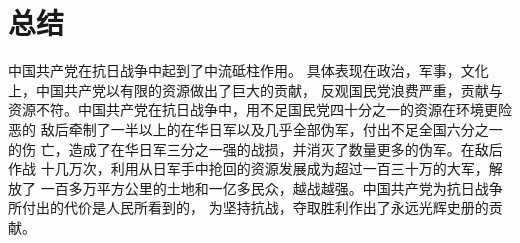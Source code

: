 \documentclass[a4paper]{article}
\begin{document}
\section{总结}
中国共产党在抗日战争中起到了中流砥柱作用。
具体表现在政治，军事，文化上，中国共产党以有限的资源做出了巨大的贡献，
反观国民党浪费严重，贡献与资源不符。中国共产党在抗日战争中，用不足国民党四十分之一的资源在环境更险恶的
敌后牵制了一半以上的在华日军以及几乎全部伪军，付出不足全国六分之一的伤
亡，造成了在华日军三分之一强的战损，并消灭了数量更多的伪军。在敌后作战
十几万次，利用从日军手中抢回的资源发展成为超过一百三十万的大军，解放了
一百多万平方公里的土地和一亿多民众，越战越强。中国共产党为抗日战争所付出的代价是人民所看到的，
为坚持抗战，夺取胜利作出了永远光辉史册的贡献。
\end{document}
